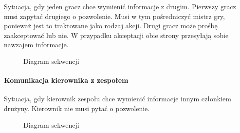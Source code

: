 \documentclass[11pt]{article}
\begin{document}
Sytuacja, gdy jeden gracz chce wymienić informacje z drugim. Pierwszy gracz musi zapytać drugiego o pozwolenie. Musi w tym pośredniczyć mistrz gry, ponieważ jest to traktowane jako rodzaj akcji. Drugi gracz może prośbę zaakceptować lub nie. W przypadku akceptacji obie strony przesyłają sobie nawzajem informacje.

\begin{figure}[!h]
	\centering
	\caption{Diagram sekwencji}
		\hspace*{-2.5cm}
\end{figure}
\FloatBarrier

\newpage

\paragraph{Komunikacja kierownika z zespołem}

Sytuacja, gdy kierownik zespołu chce wymienić informacje innym członkiem drużyny. Kierownik nie musi pytać o pozwolenie.

\begin{figure}[!h]
	\centering
	\caption{Diagram sekwencji}
\end{figure}
\FloatBarrier
\newpage
\end{document}
